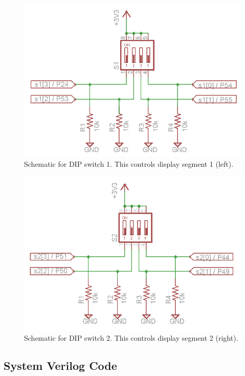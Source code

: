 \documentclass[11pt]{article}
\begin{document}
\begin{figure}[h!]
\centering
\includegraphics[scale=0.54]{s1.png}
\caption{Schematic for DIP switch 1. This controls display segment 1 (left).}
\label{fig:s1_sch}
\end{figure} 


\begin{figure}[h!]
\centering
\includegraphics[scale=0.54]{s2.png}
\caption{Schematic for DIP switch 2. This controls display segment 2 (right).}
\label{fig:s2_sch}
\end{figure} 


\clearpage
\subsection{System Verilog Code}
\end{document}

